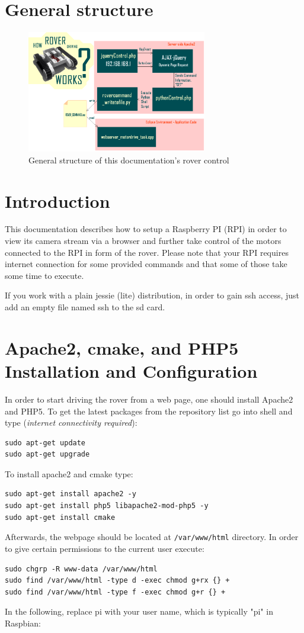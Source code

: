 \section{General structure}
\begin{figure}[h!]
\centering
\includegraphics[width=0.7\textwidth]{structure.png}
\caption{General structure of this documentation's rover control}
\label{fig:struct}
\end{figure}

\section{Introduction}
This documentation describes how to setup a Raspberry PI (RPI) in order to view its camera stream via a browser and further take control of the motors connected to the RPI in form of the rover. Please note that your RPI requires internet connection for some provided commands and that some of those take some time to execute.

If you work with a plain jessie (lite) distribution, in order to gain ssh access, just add an empty file named ssh to the sd card.
\section{Apache2, cmake, and PHP5 Installation and Configuration}
	In order to start driving the rover from a web page, one should install Apache2 and PHP5. To get the latest packages from the repository list go into shell and type (\textit{internet connectivity required}):
\begin{lstlisting}
sudo apt-get update
sudo apt-get upgrade
\end{lstlisting}
To install apache2 and cmake type:
\begin{lstlisting}
sudo apt-get install apache2 -y
sudo apt-get install php5 libapache2-mod-php5 -y
sudo apt-get install cmake
\end{lstlisting}
Afterwards, the webpage should be located at \texttt{/var/www/html} directory. In order to give certain permissions to the current user execute: 
\begin{lstlisting}
sudo chgrp -R www-data /var/www/html
sudo find /var/www/html -type d -exec chmod g+rx {} +
sudo find /var/www/html -type f -exec chmod g+r {} +
\end{lstlisting}
In the following, replace pi with your user name, which is typically "pi" in Raspbian:

